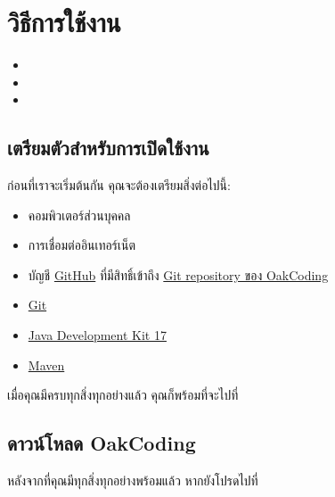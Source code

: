 \section{วิธีการใช้งาน}\label{sec:usage}

\setlength{\baselineskip}{1ex}

\begin{itemize}[leftmargin=0pt]
    \item[] 
    \item[] 
    \item[] 
\end{itemize}

\rule{0em}{1ex}

\subsection{เตรียมตัวสำหรับการเปิดใช้งาน}\label{subsec:prep-install}

ก่อนที่เราจะเริ่มต้นกัน คุณจะต้องเตรียมสิ่งต่อไปนี้:

\begin{itemize}
    \item คอมพิวเตอร์ส่วนบุคคล
    \item การเชื่อมต่ออินเทอร์เน็ต
    \item บัญชี \href{https://github.com/}{GitHub} ที่มีสิทธิ์เข้าถึง \href{https://github.com/CS211-651/project211-oakcoding.git}{Git repository ของ OakCoding}
    \item \href{https://git-scm.com/}{Git}
    \item \href{https://openjdk.org/}{Java Development Kit 17}
    \item \href{https://maven.apache.org/}{Maven}
\end{itemize}

เมื่อคุณมีครบทุกสิ่งทุกอย่างแล้ว คุณก็พร้อมที่จะไปที่ 

\clearpage

\subsection{ดาวน์โหลด OakCoding}\label{subsec:install}

หลังจากที่คุณมีทุกสิ่งทุกอย่างพร้อมแล้ว หากยังโปรดไปที่\\
\mbox{}

\rule{0em}{1ex}

